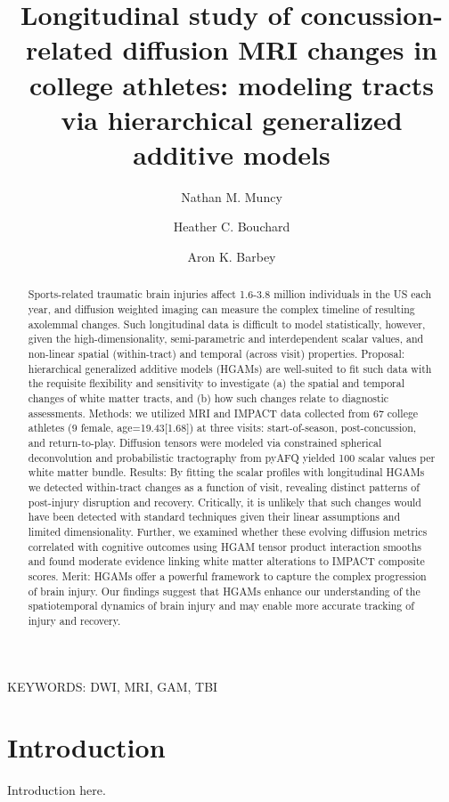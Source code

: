 \documentclass[12pt]{article}
\title{Longitudinal study of concussion-related diffusion MRI changes in college athletes: modeling tracts via hierarchical generalized additive models}
\date{}
\author[1,*]{Nathan M. Muncy}
\author[1]{Heather C. Bouchard}
\author[1]{Aron K. Barbey}
\affil[1]{Center for Brain, Behavior and Biology, University of Nebraska-Lincoln, Lincoln, Nebraska, USA}
\affil[*]{Corresponding author.	Email: nmuncy2@unl.edu}
\begin{document}
\maketitle
\pagebreak


\begin{abstract}


Sports-related traumatic brain injuries affect 1.6-3.8 million individuals in the US each year, and diffusion weighted imaging can measure the complex timeline of resulting axolemmal changes. Such longitudinal data is difficult to model statistically, however, given the high-dimensionality, semi-parametric and interdependent scalar values, and non-linear spatial (within-tract) and temporal (across visit) properties. Proposal: hierarchical generalized additive models (HGAMs) are well-suited to fit such data with the requisite flexibility and sensitivity to investigate (a) the spatial and temporal changes of white matter tracts, and (b) how such changes relate to diagnostic assessments. Methods: we utilized MRI and IMPACT data collected from 67 college athletes (9 female, age=19.43[1.68]) at three visits: start-of-season, post-concussion, and return-to-play. Diffusion tensors were modeled via constrained spherical deconvolution and probabilistic tractography from pyAFQ yielded 100 scalar values per white matter bundle. Results: By fitting the scalar profiles with longitudinal HGAMs we detected within-tract changes as a function of visit, revealing distinct patterns of post-injury disruption and recovery. Critically, it is unlikely that such changes would have been detected with standard techniques given their linear assumptions and limited dimensionality. Further, we examined whether these evolving diffusion metrics correlated with cognitive outcomes using HGAM tensor product interaction smooths and found moderate evidence linking white matter alterations to IMPACT composite scores. Merit: HGAMs offer a powerful framework to capture the complex progression of brain injury. Our findings suggest that HGAMs enhance our understanding of the spatiotemporal dynamics of brain injury and may enable more accurate tracking of injury and recovery.

\end{abstract}

\vfill
KEYWORDS: DWI, MRI, GAM, TBI\\
\pagebreak


\section{Introduction}
\label{sec:intro}
Introduction here.
\end{document}
